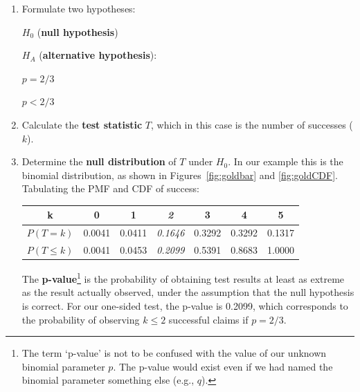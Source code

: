 \begin{enumerate}

\item Formulate two hypotheses:\medskip

\noindent\begin{minipage}{.4\textwidth}
  $H_0$ (\textbf{null hypothesis})
  
  \vspace{1em}
  
  $H_{\!A}$ (\textbf{alternative hypothesis}):
\end{minipage}
\begin{minipage}{.2\textwidth}
\end{minipage}
\begin{minipage}{.2\textwidth}
  $p={2/3}$
  
  \vspace{1em}
  
  $p<{2/3}$
\end{minipage}
\begin{minipage}{.2\textwidth}
\end{minipage}\medskip

\item Calculate the \textbf{test statistic} $T$, which in this case is
  the number of successes ($k$).

\item Determine the \textbf{null distribution} of $T$ under
  $H_0$. In our example this is the binomial distribution, as
  shown in Figures~\ref{fig:goldbar} and \ref{fig:goldCDF}. Tabulating
  the PMF and CDF of success:

  \begin{center}
  \begin{tabular}{ccccccc}
    k & 0 & 1 & \textit{2} & 3 & 4 & 5 \\ \hline
    $P(T=k)$ & 0.0041 & 0.0411 & \textit{0.1646} & 0.3292 & 0.3292 & 0.1317 \\
    $P({T}\leq{k})$ & 0.0041 & 0.0453 & \textit{0.2099} & 0.5391 & 0.8683 & 1.0000
  \end{tabular}
  \end{center}

The \textbf{p-value}\footnote{The term `p-value' is not to be confused
with the value of our unknown binomial parameter $p$. The p-value
would exist even if we had named the binomial parameter something else
(e.g., $q$).} is the probability of obtaining test results at least as
extreme as the result actually observed, under the assumption that the
null hypothesis is correct. For our one-sided test, the p-value is
0.2099, which corresponds to the probability of observing $k\leq{2}$
successful claims if $p=2/3$.
  

\end{enumerate}
